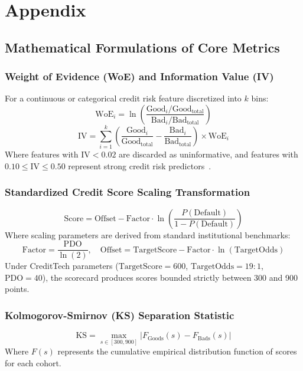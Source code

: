 \documentclass[11pt,a4paper,oneside]{report}
\begin{document}





\appendix

\chapter{Appendix}
\label{chap:appendix}

\section{Mathematical Formulations of Core Metrics}

\subsection{Weight of Evidence (WoE) and Information Value (IV)}
For a continuous or categorical credit risk feature discretized into $k$ bins:
$$\text{WoE}_i = \ln \left( \frac{\text{Good}_i / \text{Good}_{\text{total}}}{\text{Bad}_i / \text{Bad}_{\text{total}}} \right)$$
$$\text{IV} = \sum_{i=1}^{k} \left( \frac{\text{Good}_i}{\text{Good}_{\text{total}}} - \frac{\text{Bad}_i}{\text{Bad}_{\text{total}}} \right) \times \text{WoE}_i$$
Where features with $\text{IV} < 0.02$ are discarded as uninformative, and features with $0.10 \le \text{IV} \le 0.50$ represent strong credit risk predictors~\cite{thomas_credit_2017}.

\subsection{Standardized Credit Score Scaling Transformation}
$$\text{Score} = \text{Offset} - \text{Factor} \cdot \ln \left( \frac{P(\text{Default})}{1 - P(\text{Default})} \right)$$
Where scaling parameters are derived from standard institutional benchmarks:
$$\text{Factor} = \frac{\text{PDO}}{\ln(2)}, \quad \text{Offset} = \text{TargetScore} - \text{Factor} \cdot \ln(\text{TargetOdds})$$
Under CreditTech parameters ($\text{TargetScore} = 600$, $\text{TargetOdds} = 19:1$, $\text{PDO} = 40$), the scorecard produces scores bounded strictly between 300 and 900 points.

\subsection{Kolmogorov-Smirnov (KS) Separation Statistic}
$$\text{KS} = \max_{s \in [300, 900]} \left| F_{\text{Goods}}(s) - F_{\text{Bads}}(s) \right|$$
Where $F(s)$ represents the cumulative empirical distribution function of scores for each cohort.
\end{document}
